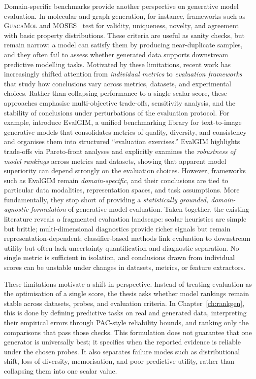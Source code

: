 Domain-specific benchmarks provide another perspective on generative model evaluation.
In molecular and graph generation, for instance, frameworks such as \textsc{GuacaMol} and
\textsc{MOSES}~\citep{brown2019guacamol,polykovskiy2020moses} test for validity, uniqueness,
novelty, and agreement with basic property distributions.
These criteria are useful as sanity checks, but remain narrow: a model can satisfy them by
producing near-duplicate samples, and they often fail to assess whether generated data
supports downstream predictive modelling tasks. Motivated by these limitations, recent work has increasingly shifted attention from
\emph{individual metrics} to \emph{evaluation frameworks} that study how conclusions vary
across metrics, datasets, and experimental choices.
Rather than collapsing performance to a single scalar score, these approaches emphasise
multi-objective trade-offs, sensitivity analysis, and the stability of conclusions under
perturbations of the evaluation protocol.
For example, \citet{hall2024evalgim} introduce EvalGIM, a unified benchmarking library for
text-to-image generative models that consolidates metrics of quality, diversity, and
consistency and organises them into structured ``evaluation exercises.''
EvalGIM highlights trade-offs via Pareto-front analyses and explicitly examines the
\emph{robustness of model rankings} across metrics and datasets, showing that apparent
model superiority can depend strongly on the evaluation choices.
However, frameworks such as EvalGIM remain \emph{domain-specific}, and their conclusions are
tied to particular data modalities, representation spaces, and task assumptions.
More fundamentally, they stop short of providing a \emph{statistically grounded,
domain-agnostic formulation} of generative model evaluation.
Taken together, the existing literature reveals a fragmented evaluation landscape:
scalar heuristics are simple but brittle; multi-dimensional diagnostics provide richer
signals but remain representation-dependent; classifier-based methods link evaluation
to downstream utility but often lack uncertainty quantification and diagnostic separation.
No single metric is sufficient in isolation, and conclusions drawn from individual scores
can be unstable under changes in datasets, metrics, or feature extractors.

These limitations motivate a shift in perspective. Instead of treating
evaluation as the optimisation of a single score, the thesis asks whether model
rankings remain stable across datasets, probes, and evaluation criteria. In
Chapter~\ref{ch:rankgen}, this is done by defining predictive tasks on real and
generated data, interpreting their empirical errors through PAC-style
reliability bounds, and ranking only the comparisons that pass those checks.
This formulation does not guarantee that one generator is universally best; it
specifies when the reported evidence is reliable under the chosen probes. It
also separates failure modes such as distributional shift, loss of diversity,
memorisation, and poor predictive utility, rather than collapsing them into one
scalar value.

